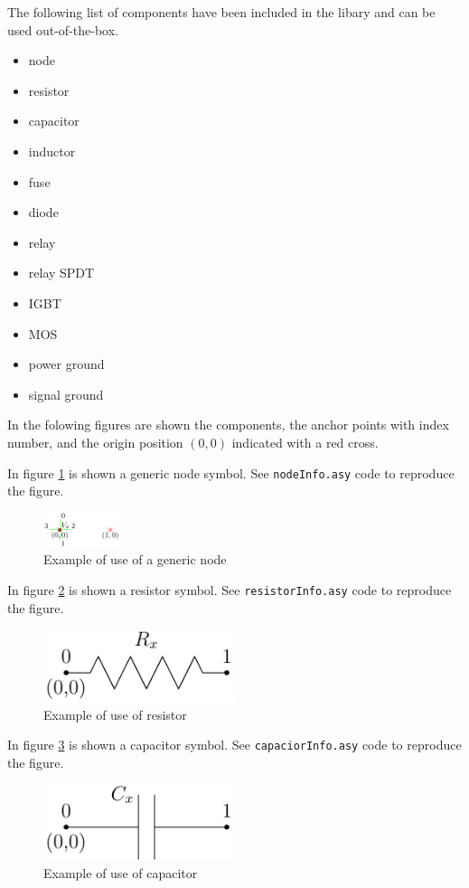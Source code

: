 \documentclass[a4paper,12pt]{report}
\begin{document}
The following list of components have been included in the libary and can be used out-of-the-box.
\begin{itemize}
\item node
\item resistor
\item capacitor
\item inductor
\item fuse
\item diode
\item relay
\item relay SPDT
\item IGBT
\item MOS
\item power ground
\item signal ground
\end{itemize}

In the folowing figures are shown the components, the anchor points with index number, and the origin position $(0,0)$ indicated with a red cross.

In figure \ref{nodeInfo} is shown a generic node symbol. See \texttt{nodeInfo.asy} code to reproduce the figure.

\begin{figure}[ht]
\centering
\includegraphics[width=0.2\textwidth]{nodeInfo}
\caption{Example of use of a generic node}
\label{nodeInfo}
\end{figure}

In figure \ref{resistorInfo} is shown a resistor symbol. See \texttt{resistorInfo.asy} code to reproduce the figure.

\begin{figure}[ht]
\centering
\includegraphics[width=0.5\textwidth]{resistorInfo}
\caption{Example of use of resistor}
\label{resistorInfo}
\end{figure}

In figure \ref{capaciorInfo} is shown a capacitor symbol. See \texttt{capaciorInfo.asy} code to reproduce the figure.

\begin{figure}[ht]
\centering
\includegraphics[width=0.5\textwidth]{capacitorInfo}
\caption{Example of use of capacitor}
\label{capaciorInfo}
\end{figure}
\end{document}
